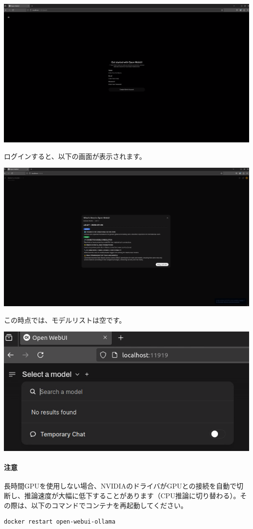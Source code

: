 \includegraphics[width=0.8\linewidth]{images/Pasted image 20250304171548.png}

ログインすると、以下の画面が表示されます。

\includegraphics[width=0.8\linewidth]{images/Pasted image 20250304171722.png}

この時点では、モデルリストは空です。

\includegraphics[width=0.8\linewidth]{images/Pasted image 20250304171753.png}

\paragraph{注意} 長時間GPUを使用しない場合、NVIDIAのドライバがGPUとの接続を自動で切断し、推論速度が大幅に低下することがあります（CPU推論に切り替わる）。その際は、以下のコマンドでコンテナを再起動してください。
\begin{lstlisting}[language=bash]
docker restart open-webui-ollama
\end{lstlisting}

